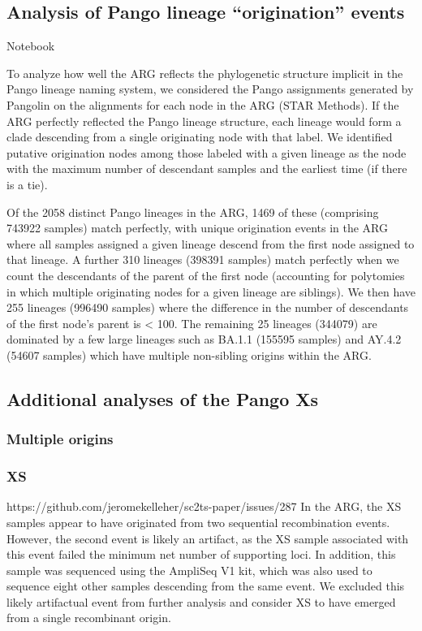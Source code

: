 \documentclass[12pt,letterpaper]{article}
\begin{document}
\subsection*{Analysis of Pango lineage ``origination'' events}
Notebook

To analyze how well the ARG reflects the phylogenetic structure implicit in the Pango lineage naming system,
we considered the Pango assignments generated by Pangolin on the alignments for each node in the ARG (STAR Methods).
If the ARG perfectly reflected the Pango lineage structure,
each lineage would form a clade descending from a single originating node with that label.
We identified putative origination nodes among those labeled with a given lineage as the node
with the maximum number of descendant samples and the earliest time (if there is a tie).

Of the 2058 distinct Pango lineages in the ARG,
1469 of these (comprising 743922 samples) match perfectly,
with unique origination events in the ARG
where all samples assigned a given lineage descend from the first node assigned to that lineage.
A further 310 lineages (398391 samples) match perfectly
when we count the descendants of the parent of the first node
(accounting for polytomies in which multiple originating nodes for a given lineage are siblings).
We then have 255 lineages (996490 samples)
where the difference in the number of descendants of the first node's parent is < 100.
The remaining 25 lineages (344079) are dominated by a few large lineages such as BA.1.1 (155595 samples) and AY.4.2 (54607 samples)
which have multiple non-sibling origins within the ARG.


\subsection*{Additional analyses of the Pango Xs}
\subsubsection*{Multiple origins}
\subsubsection*{XS}
https://github.com/jeromekelleher/sc2ts-paper/issues/287
In the ARG, the XS samples appear to have originated from two sequential recombination events.
However, the second event is likely an artifact,
as the XS sample associated with this event failed the minimum net number of supporting loci.
In addition, this sample was sequenced using the AmpliSeq V1 kit,
which was also used to sequence eight other samples descending from the same event.
We excluded this likely artifactual event from further analysis and
consider XS to have emerged from a single recombinant origin.
\end{document}
